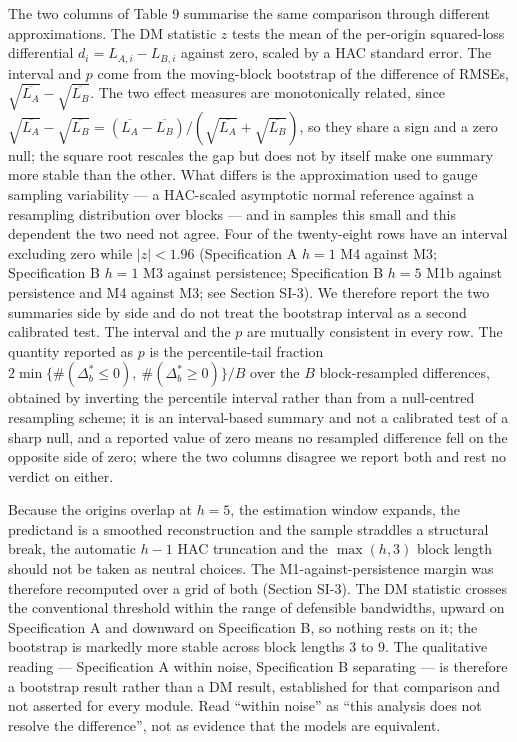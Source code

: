 \documentclass[11pt]{article}
\begin{document}
The two columns of Table 9 summarise the same comparison through
different approximations. The DM statistic \(z\) tests the mean of the
per-origin squared-loss differential \(d_i = L_{A,i} - L_{B,i}\) against
zero, scaled by a HAC standard error. The interval and \(p\) come from
the moving-block bootstrap of the difference of RMSEs,
\(\sqrt{\overline{L_A}} - \sqrt{\overline{L_B}}\). The two effect
measures are monotonically related, since
\(\sqrt{\overline{L_A}}-\sqrt{\overline{L_B}} =
(\overline{L_A}-\overline{L_B})/(\sqrt{\overline{L_A}}+
\sqrt{\overline{L_B}})\), so they share a sign and a zero null; the
square root rescales the gap but does not by itself make one summary
more stable than the other. What differs is the approximation used to
gauge sampling variability --- a HAC-scaled asymptotic normal reference
against a resampling distribution over blocks --- and in samples this
small and this dependent the two need not agree. Four of the
twenty-eight rows have an interval excluding zero while \(|z| < 1.96\)
(Specification A \(h=1\) M4 against M3; Specification B \(h=1\) M3
against persistence; Specification B \(h=5\) M1b against persistence and
M4 against M3; see Section SI-3). We therefore report the two
summaries side by side
and do not treat the bootstrap interval as a second calibrated test. The interval and the \(p\) are mutually
consistent in every row. The quantity reported as \(p\) is the percentile-tail fraction
\(2\min\{\#(\Delta^{*}_b\le 0),\ \#(\Delta^{*}_b\ge 0)\}/B\) over the
\(B\) block-resampled differences, obtained by inverting the percentile
interval rather than from a null-centred resampling scheme; it is an
interval-based summary and not a calibrated test of a sharp null, and a
reported value of zero means no resampled difference fell on the
opposite side of zero; where the two columns disagree we
report both and rest no verdict on either.

Because the origins overlap at \(h=5\), the estimation window expands,
the predictand is a smoothed reconstruction and the sample straddles a
structural break, the automatic \(h-1\) HAC truncation and the
\(\max(h,3)\) block length should not be taken as neutral choices. The
M1-against-persistence margin was therefore recomputed over a grid of
both (Section SI-3). The DM statistic crosses the conventional
threshold within the range of defensible bandwidths, upward on
Specification A and downward on Specification B, so nothing rests on it;
the bootstrap is markedly more stable across block lengths \(3\) to
\(9\). The qualitative reading --- Specification A within noise,
Specification B separating --- is therefore a bootstrap result rather
than a DM result, established for that comparison and not asserted for
every module. Read
``within noise'' as ``this analysis does not resolve the difference'',
not as evidence that the models are equivalent.
\end{document}
